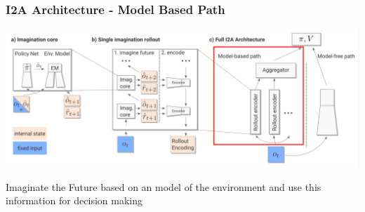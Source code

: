 
%    


\begin{frame}
    \frametitle{I2A Architecture - Model Based Path}


\includegraphics[width=\columnwidth]{./Images/i2a_all_model_based_path.png}%

\begin{PraesentationAufzaehlung}
	\item Imaginate the Future based on an model of the environment and use this information for decision making
\end{PraesentationAufzaehlung}
    
\end{frame}
\clearpage

